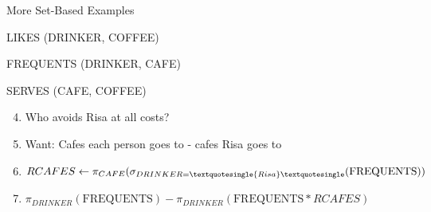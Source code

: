 \documentclass[aspectratio=169]{beamer}
\newenvironment{noindentitemize}
{ \begin{itemize}
 \setlength{\itemsep}{1.5ex}
  \setlength{\parsep}{0pt}   
  \setlength{\parskip}{0pt}
 \addtolength{\leftskip}{-2em}
 }
{ \end{itemize} }
\newcommand{\FREQUENTS}{\textrm{FREQUENTS}}
\begin{document}
\begin{frame}{More Set-Based Examples}

LIKES (DRINKER, COFFEE)

FREQUENTS (DRINKER, CAFE)

SERVES (CAFE, COFFEE)
\begin{enumerate}
\setcounter{enumi}{3}
\item Who avoids Risa at all costs?
\item[] Want: Cafes each person goes to - cafes Risa goes to
\item[] $RCAFES \leftarrow  \pi_{CAFE}(\sigma_{DRINKER=\textquotesingle{Risa}\textquotesingle}(\FREQUENTS))$\\
\item[] $\pi_{DRINKER}(\FREQUENTS) - \pi_{DRINKER}(\FREQUENTS * RCAFES)$
\end{enumerate}
\end{frame}



%
%
%
%
%

\end{document}
